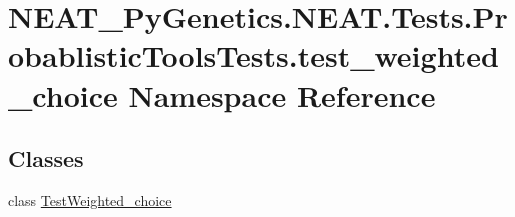 \hypertarget{namespaceNEAT__PyGenetics_1_1NEAT_1_1Tests_1_1ProbablisticToolsTests_1_1test__weighted__choice}{}\section{N\+E\+A\+T\+\_\+\+Py\+Genetics.\+N\+E\+A\+T.\+Tests.\+Probablistic\+Tools\+Tests.\+test\+\_\+weighted\+\_\+choice Namespace Reference}
\label{namespaceNEAT__PyGenetics_1_1NEAT_1_1Tests_1_1ProbablisticToolsTests_1_1test__weighted__choice}
\subsection*{Classes}
\begin{DoxyCompactItemize}
\item 
class \hyperlink{classNEAT__PyGenetics_1_1NEAT_1_1Tests_1_1ProbablisticToolsTests_1_1test__weighted__choice_1_1TestWeighted__choice}{Test\+Weighted\+\_\+choice}
\end{DoxyCompactItemize}
